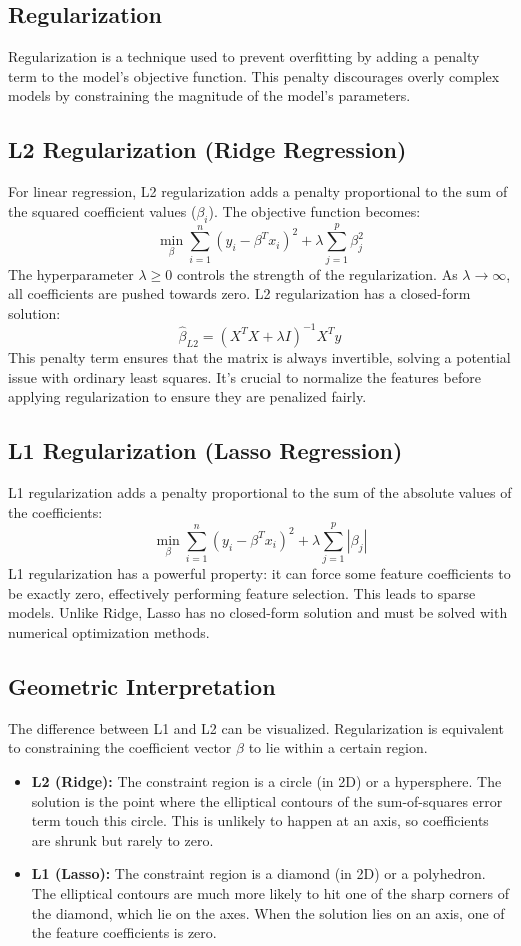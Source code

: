 \documentclass{article}
\begin{document}
\begin{multicols}{2}
\section{Regularization}
Regularization is a technique used to prevent overfitting by adding a penalty term to the model's objective function. This penalty discourages overly complex models by constraining the magnitude of the model's parameters.

\subsection{L2 Regularization (Ridge Regression)}
For linear regression, L2 regularization adds a penalty proportional to the sum of the squared coefficient values ($\beta_i$). The objective function becomes:
$$ \min_{\beta} \sum_{i=1}^{n} (y_i - \beta^T x_i)^2 + \lambda \sum_{j=1}^{p} \beta_j^2 $$
The hyperparameter $\lambda \ge 0$ controls the strength of the regularization. As $\lambda \to \infty$, all coefficients are pushed towards zero. L2 regularization has a closed-form solution:
$$ \hat{\beta}_{L2} = (X^T X + \lambda I)^{-1} X^T y $$
This penalty term ensures that the matrix is always invertible, solving a potential issue with ordinary least squares. It's crucial to normalize the features before applying regularization to ensure they are penalized fairly.

\subsection{L1 Regularization (Lasso Regression)}
L1 regularization adds a penalty proportional to the sum of the absolute values of the coefficients:
$$ \min_{\beta} \sum_{i=1}^{n} (y_i - \beta^T x_i)^2 + \lambda \sum_{j=1}^{p} |\beta_j| $$
L1 regularization has a powerful property: it can force some feature coefficients to be exactly zero, effectively performing feature selection. This leads to sparse models. Unlike Ridge, Lasso has no closed-form solution and must be solved with numerical optimization methods.

\subsection{Geometric Interpretation}
The difference between L1 and L2 can be visualized. Regularization is equivalent to constraining the coefficient vector $\beta$ to lie within a certain region.
\begin{itemize}
    \item \textbf{L2 (Ridge):} The constraint region is a circle (in 2D) or a hypersphere. The solution is the point where the elliptical contours of the sum-of-squares error term touch this circle. This is unlikely to happen at an axis, so coefficients are shrunk but rarely to zero.
    \item \textbf{L1 (Lasso):} The constraint region is a diamond (in 2D) or a polyhedron. The elliptical contours are much more likely to hit one of the sharp corners of the diamond, which lie on the axes. When the solution lies on an axis, one of the feature coefficients is zero.
\end{itemize}


\end{multicols}
\end{document}
